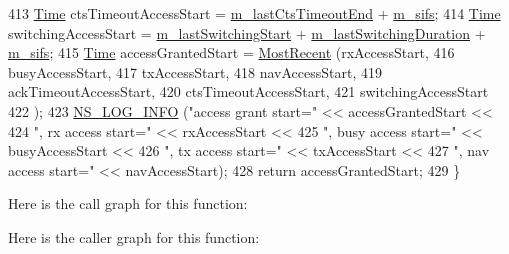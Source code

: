 \begin{DoxyCode}
413   \hyperlink{namespacens3_1_1TracedValueCallback_a7ffd3e7c142ffe7c8a1d2db9b8de38ec}{Time} ctsTimeoutAccessStart = \hyperlink{classns3_1_1DcfManager_abeffda3976f92d50616835e3b8b34e32}{m\_lastCtsTimeoutEnd} + 
      \hyperlink{classns3_1_1DcfManager_a1b062fb95502cbd176d76985c8254f35}{m\_sifs};
414   \hyperlink{namespacens3_1_1TracedValueCallback_a7ffd3e7c142ffe7c8a1d2db9b8de38ec}{Time} switchingAccessStart = \hyperlink{classns3_1_1DcfManager_afdb592d5f09af096f13c275834e16516}{m\_lastSwitchingStart} + 
      \hyperlink{classns3_1_1DcfManager_addb6585ae1360770ff609e7b944cbbf7}{m\_lastSwitchingDuration} + \hyperlink{classns3_1_1DcfManager_a1b062fb95502cbd176d76985c8254f35}{m\_sifs};
415   \hyperlink{namespacens3_1_1TracedValueCallback_a7ffd3e7c142ffe7c8a1d2db9b8de38ec}{Time} accessGrantedStart = \hyperlink{classns3_1_1DcfManager_a3e3b86a249935fd05b765526696a1dd2}{MostRecent} (rxAccessStart,
416                                         busyAccessStart,
417                                         txAccessStart,
418                                         navAccessStart,
419                                         ackTimeoutAccessStart,
420                                         ctsTimeoutAccessStart,
421                                         switchingAccessStart
422                                         );
423   \hyperlink{group__logging_gafbd73ee2cf9f26b319f49086d8e860fb}{NS\_LOG\_INFO} (\textcolor{stringliteral}{"access grant start="} << accessGrantedStart <<
424                \textcolor{stringliteral}{", rx access start="} << rxAccessStart <<
425                \textcolor{stringliteral}{", busy access start="} << busyAccessStart <<
426                \textcolor{stringliteral}{", tx access start="} << txAccessStart <<
427                \textcolor{stringliteral}{", nav access start="} << navAccessStart);
428   \textcolor{keywordflow}{return} accessGrantedStart;
429 \}
\end{DoxyCode}


Here is the call graph for this function\+:




Here is the caller graph for this function\+:


